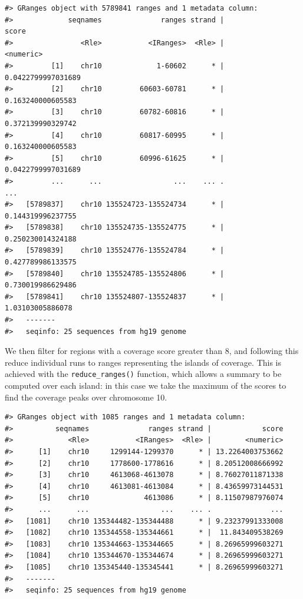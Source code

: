 \documentclass[]{article}
\newenvironment{Shaded}{\begin{snugshade}}{\end{snugshade}}
\newcommand{\DataTypeTok}[1]{\textcolor[rgb]{0.13,0.29,0.53}{#1}}
\newcommand{\DecValTok}[1]{\textcolor[rgb]{0.00,0.00,0.81}{#1}}
\newcommand{\KeywordTok}[1]{\textcolor[rgb]{0.13,0.29,0.53}{\textbf{#1}}}
\newcommand{\NormalTok}[1]{#1}
\newcommand{\OperatorTok}[1]{\textcolor[rgb]{0.81,0.36,0.00}{\textbf{#1}}}
\newcommand{\StringTok}[1]{\textcolor[rgb]{0.31,0.60,0.02}{#1}}
\begin{document}
\begin{verbatim}
#> GRanges object with 5789841 ranges and 1 metadata column:
#>             seqnames              ranges strand |              score
#>                <Rle>           <IRanges>  <Rle> |          <numeric>
#>         [1]    chr10             1-60602      * | 0.0422799997031689
#>         [2]    chr10         60603-60781      * |  0.163240000605583
#>         [3]    chr10         60782-60816      * |  0.372139990329742
#>         [4]    chr10         60817-60995      * |  0.163240000605583
#>         [5]    chr10         60996-61625      * | 0.0422799997031689
#>         ...      ...                 ...    ... .                ...
#>   [5789837]    chr10 135524723-135524734      * |  0.144319996237755
#>   [5789838]    chr10 135524735-135524775      * |  0.250230014324188
#>   [5789839]    chr10 135524776-135524784      * |  0.427789986133575
#>   [5789840]    chr10 135524785-135524806      * |  0.730019986629486
#>   [5789841]    chr10 135524807-135524837      * |   1.03103005886078
#>   -------
#>   seqinfo: 25 sequences from hg19 genome
\end{verbatim}

We then filter for regions with a coverage score greater than 8, and
following this reduce individual runs to ranges representing the islands
of coverage. This is achieved with the \texttt{reduce\_ranges()}
function, which allows a summary to be computed over each island: in
this case we take the maximum of the scores to find the coverage peaks
over chromosome 10.

\begin{Shaded}
\end{Shaded}

\begin{verbatim}
#> GRanges object with 1085 ranges and 1 metadata column:
#>          seqnames              ranges strand |            score
#>             <Rle>           <IRanges>  <Rle> |        <numeric>
#>      [1]    chr10     1299144-1299370      * | 13.2264003753662
#>      [2]    chr10     1778600-1778616      * | 8.20512008666992
#>      [3]    chr10     4613068-4613078      * | 8.76027011871338
#>      [4]    chr10     4613081-4613084      * | 8.43659973144531
#>      [5]    chr10             4613086      * | 8.11507987976074
#>      ...      ...                 ...    ... .              ...
#>   [1081]    chr10 135344482-135344488      * | 9.23237991333008
#>   [1082]    chr10 135344558-135344661      * |  11.843409538269
#>   [1083]    chr10 135344663-135344665      * | 8.26965999603271
#>   [1084]    chr10 135344670-135344674      * | 8.26965999603271
#>   [1085]    chr10 135345440-135345441      * | 8.26965999603271
#>   -------
#>   seqinfo: 25 sequences from hg19 genome
\end{verbatim}
\end{document}
